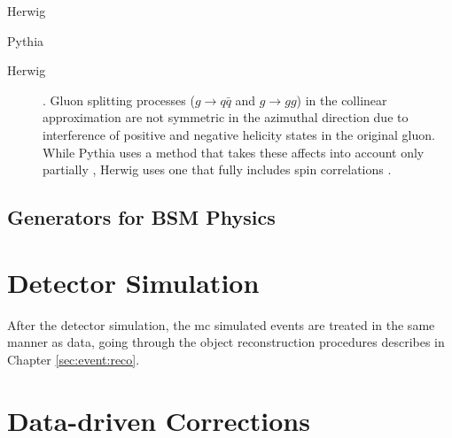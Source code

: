 \begin{description}
\item[Herwig] \cite{Corcella:2000bw,Bahr:2008pv,Bellm:2015jjp}
\item[Pythia] \cite{Sjostrand:2006za,Sjostrand:2014zea}
\item[Herwig] \cite{Gleisberg:2008ta}. Gluon splitting processes ($g \rightarrow q\bar{q}$ and $g \rightarrow gg$) in the collinear approximation are not symmetric in the azimuthal direction due to interference of positive and negative helicity states in the original gluon. While Pythia uses a method that takes these affects into account only partially \cite{Webber:1987uy}, Herwig uses one that fully includes spin correlations \cite{Collins:1987cp}. 
\end{description}

\subsection{Generators for BSM Physics}


\section{Detector Simulation}

After the detector simulation, the \gls{mc} simulated events are treated in the same manner as data, going through the object reconstruction procedures
describes in Chapter \ref{sec:event:reco}.

\section{Data-driven Corrections}
